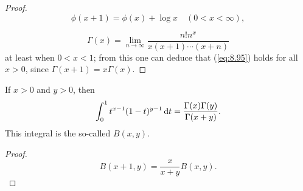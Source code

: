 \begin{proof}
    \begin{equation}
        \label{eq:8.94}
        \phi(x+1) = \phi(x) + \log x
        \quad 
        (0 < x < \infty),
    \end{equation}

    \begin{equation}
        \label{eq:8.95}
        \Gamma(x) = 
        \lim_{n \to \infty} \frac{n!n^x}{x(x+1)\cdots(x+n)}
    \end{equation}
    at least when $0 < x < 1$; 
    from this one can deduce that (\ref{eq:8.95}) holds for all $x > 0$,
    since $\Gamma(x+1)=x\Gamma(x)$.
\end{proof}

\begin{thm}
    \label{thm:8.20}
    If $x>0$ and $y>0$, then 
    \begin{equation}
        \label{eq:8.96}
        \int_{0}^{1} t^{x-1}(1-t)^{y-1} \d t = 
        \frac{\Gamma(x)\Gamma(y)}{\Gamma(x+y)}.
    \end{equation}
    This integral is the so-called  $B(x, y)$.
\end{thm}


\begin{proof}
    \begin{equation}
        \label{eq:8.97}
        B(x+1,y) = \frac{x}{x+y}B(x,y) .
    \end{equation}
\end{proof}


